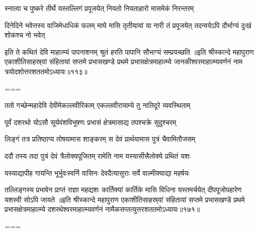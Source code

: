 \twolineshloka
{स्नात्वा च पुष्करे तीर्थे यस्तल्लिगं प्रपूजयेत्}
{नियतो नियताहारो मासमेकं निरन्तरम्}%

\threelineshloka
{दिनेदिने भवेत्तस्य वाजिमेधाधिकं फलम्}
{माघे मासि तृतीयायां या नारी तं प्रपूजयेत्}
{तदन्वयेऽपि दौर्भाग्यं दुःखं शोकश्च नो भवेत्}%

\twolineshloka
{इति ते कथितं देवि माहात्म्यं पापनाशनम्}
{श्रुतं हरति पापानि सौभाग्यं सम्प्रयच्छति}%
॥इति श्रीस्कान्दे महापुराण एकाशीतिसाहस्र्यां संहितायां सप्तमे प्रभासखण्डे प्रथमे प्रभासक्षेत्रमाहात्म्ये जानकीश्वरमाहात्म्यवर्णनं नाम त्रयोदशोत्तरशततमोऽध्यायः॥११३॥

===


\vakta{}
\shrota{}
\tags{}
\notes{}

\storymeta





\twolineshloka
{ततो गच्छेन्महादेवि देवीमेकल्लवीरिकाम्}
{एकल्लवीरायाम्ये तु नातिदूरे व्यवस्थिताम्}%

\twolineshloka
{पूर्वं दशरथो योऽसौ सूर्यवंशविभूषणः}
{प्रभासं क्षेत्रमासाद्य तपश्चक्रे सुदुश्चरम्}%

\twolineshloka
{लिङ्गं तत्र प्रतिष्ठाप्य तोषयामास शाङ्करम्}
{स देवं प्रार्थयामास पुत्रं चैवामितौजसम्}%

\twolineshloka
{ददौ तस्य तदा पुत्रं देवं त्रैलोक्यपूजितम्}
{रामेति नाम यस्यासीत्त्रैलोक्ये प्रथितं यशः}%

\twolineshloka
{यस्याद्यापीह गायन्ति भूर्भुवःस्वर्नि वासिनः}
{देवदैत्यासुराः सर्वे वाल्मीक्याद्या महर्षयः}%

\threelineshloka
{तल्लिङ्गस्य प्रभावेन प्राप्तं राज्ञा महद्यशः}
{कार्तिक्यां कार्तिके मासि विधिना यस्तमर्चयेत्}
{दीपपूजोपहारेण यशस्वी सोऽपि जायते}%
॥इति श्रीस्कान्दे महापुराण एकाशीतिसाहस्र्यां संहितायां सप्तमे प्रभासखण्डे प्रथमे प्रभासक्षेत्रमाहात्म्ये दशरथेश्वरमाहात्म्यवर्णनं नामैकसप्तत्युत्तरशततमोऽध्यायः॥१७१॥

===


\tags{}
\notes{}

